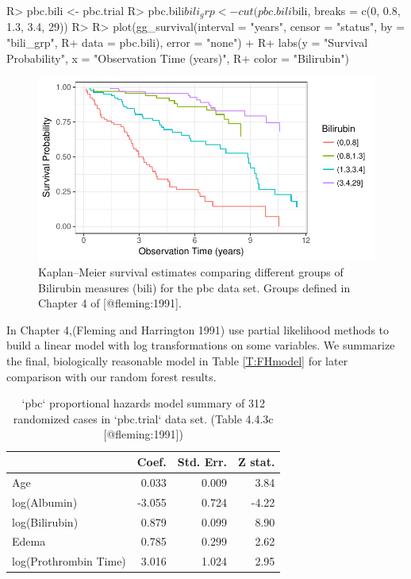 \documentclass[article]{jss}
\begin{document}
\begin{Schunk}
\begin{Sinput}
R> pbc.bili <- pbc.trial
R> pbc.bili$bili_grp <- cut(pbc.bili$bili, breaks = c(0, 0.8, 1.3, 3.4, 29))
R> 
R> plot(gg_survival(interval = "years", censor = "status", by = "bili_grp",
R+                  data = pbc.bili), error = "none") +
R+   labs(y = "Survival Probability", x = "Observation Time (years)",
R+        color = "Bilirubin")
\end{Sinput}
\begin{figure}[!htb]

{\centering \includegraphics{fig-rfs/rfs-gg_survival-bili-1} 

}

\caption[Kaplan--Meier survival estimates comparing different groups of Bilirubin measures (bili) for the pbc data set]{Kaplan--Meier survival estimates comparing different groups of Bilirubin measures (bili) for the pbc data set. Groups defined in Chapter 4 of [@fleming:1991].}\label{fig:gg_survival-bili}
\end{figure}
\end{Schunk}

In Chapter 4,(Fleming and Harrington 1991) use partial likelihood
methods to build a linear model with log transformations on some
variables. We summarize the final, biologically reasonable model in
Table \ref{T:FHmodel} for later comparison with our random forest
results.

\begin{table}

\caption{`pbc` proportional hazards model summary of 312 randomized cases in `pbc.trial` data set.  (Table 4.4.3c [@fleming:1991])}
\centering
\begin{tabular}[t]{l|r|r|r}
\hline
  & Coef. & Std. Err. & Z stat.\\
\hline
Age & 0.033 & 0.009 & 3.84\\
\hline
log(Albumin) & -3.055 & 0.724 & -4.22\\
\hline
log(Bilirubin) & 0.879 & 0.099 & 8.90\\
\hline
Edema & 0.785 & 0.299 & 2.62\\
\hline
log(Prothrombin Time) & 3.016 & 1.024 & 2.95\\
\hline
\end{tabular}
\end{table}
\end{document}
